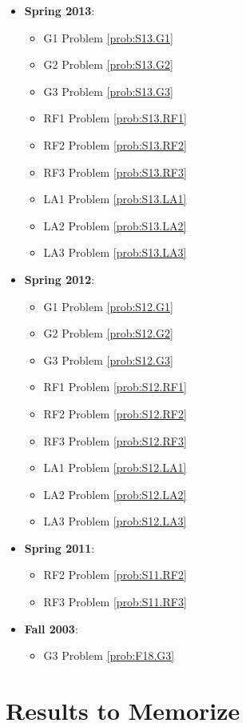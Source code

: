 \documentclass{article}
\theoremstyle{definition}
\begin{document}
\begin{itemize}
	\item \textbf{Spring 2013}:  
	\begin{itemize}
	\item G1 Problem \ref{prob:S13.G1} 
	\item G2 Problem \ref{prob:S13.G2} 
	\item G3 Problem \ref{prob:S13.G3}
	\item RF1 Problem \ref{prob:S13.RF1}
	\item RF2 Problem \ref{prob:S13.RF2}
	\item RF3 Problem \ref{prob:S13.RF3}
	\item LA1 Problem \ref{prob:S13.LA1}
	\item LA2 Problem \ref{prob:S13.LA2}
	\item LA3 Problem \ref{prob:S13.LA3}
	\end{itemize}
	\item \textbf{Spring 2012}:  
	\begin{itemize}
	\item G1 Problem \ref{prob:S12.G1} 
	\item G2 Problem \ref{prob:S12.G2} 
	\item G3 Problem \ref{prob:S12.G3}
	\item RF1 Problem \ref{prob:S12.RF1}
	\item RF2 Problem \ref{prob:S12.RF2}
	\item RF3 Problem \ref{prob:S12.RF3}
	\item LA1 Problem \ref{prob:S12.LA1}
	\item LA2 Problem \ref{prob:S12.LA2}
	\item LA3 Problem \ref{prob:S12.LA3}
	\end{itemize}
	\item \textbf{Spring 2011}:
	\begin{itemize}
		\item RF2 Problem \ref{prob:S11.RF2}
		\item RF3 Problem \ref{prob:S11.RF3}
	\end{itemize}
	\item \textbf{Fall 2003}:
	\begin{itemize}
		\item G3 Problem \ref{prob:F18.G3}
	\end{itemize}
\end{itemize}

\section{Results to Memorize}
\end{document}
